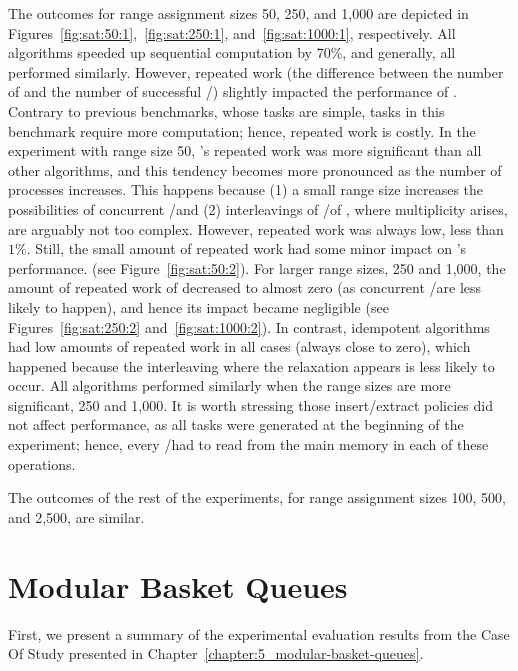 The outcomes for range assignment sizes 50, 250, and 1,000 are depicted in Figures~\ref{fig:sat:50:1},~\ref{fig:sat:250:1}, and~\ref{fig:sat:1000:1}, respectively. All algorithms speeded up sequential computation by 70\%, and generally, all performed similarly. However, repeated work (the difference between the number of \Puts and the number of successful \Takes/\Steals) slightly impacted the performance of \NCWSM. Contrary to previous benchmarks, whose tasks are simple, tasks in this benchmark require more computation; hence, repeated work is costly. In the experiment with range size 50, \NCWSM's repeated work was more significant than all other algorithms, and this tendency becomes more pronounced as the number of processes increases. This happens because (1) a small range size increases the possibilities of concurrent \Puts/\Takes and (2) interleavings of \Puts/\Takes of \NCWSM, where multiplicity arises, are arguably not too complex. However, repeated work was always low, less than $1\%$. Still, the small amount of repeated work had some minor impact on \NCWSM's performance.  (see Figure~\ref{fig:sat:50:2}).  For larger range sizes, 250 and 1,000, the amount of repeated work of \NCWSM decreased to almost zero (as concurrent \Puts/\Takes are less likely to happen), and hence its impact became negligible (see Figures~\ref{fig:sat:250:2} and~\ref{fig:sat:1000:2}). In contrast, idempotent algorithms had low amounts of repeated work in all cases (always close to zero), which happened because the interleaving where the relaxation appears is less likely to occur. All algorithms performed similarly when the range sizes are more significant, 250 and 1,000. It is worth stressing those insert/extract policies did not affect performance, as all tasks were generated at the beginning of the experiment; hence, every \Take/\Steal had to read from the main memory in each of these operations.

The outcomes of the rest of the experiments, for range assignment sizes 100, 500, and 2,500, are similar.  %

\section{Modular Basket Queues}

First, we present a summary of the experimental evaluation results from the Case Of Study presented in Chapter~\ref{chapter:5_modular-basket-queues}.

